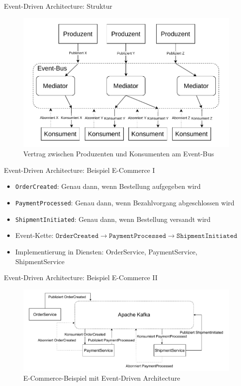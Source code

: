 \begin{frame}{Event-Driven Architecture: Struktur}
    \begin{figure}[!h]
        \centering
        \includegraphics[scale=0.55]{imglib/eda/eda.drawio}
        \caption{Vertrag zwischen Produzenten und Konsumenten am Event-Bus}
        \label{fig:eda}
    \end{figure}
\end{frame}

\begin{frame}{Event-Driven Architecture: Beispiel E-Commerce I}
    \begin{itemize}
        \item \texttt{OrderCreated}: Genau dann, wenn Bestellung aufgegeben wird
        \item \texttt{PaymentProcessed}: Genau dann, wenn Bezahlvorgang abgeschlossen wird
        \item \texttt{ShipmentInitiated}: Genau dann, wenn Bestellung versandt wird
        \item Event-Kette: $ \texttt{OrderCreated} \rightarrow \texttt{PaymentProcessed} \rightarrow \texttt{ShipmentInitiated}$
        \item Implementierung in Diensten: OrderService, PaymentService, ShipmentService
    \end{itemize}
\end{frame}

\begin{frame}{Event-Driven Architecture: Beispiel E-Commerce II}
    \begin{figure}[!h]
        \centering
        \includegraphics[scale=0.5]{imglib/eda/eda-ecommerce.drawio}
        \caption{E-Commerce-Beispiel mit Event-Driven Architecture}
        \label{fig:edaecommerce}
    \end{figure}
\end{frame}

